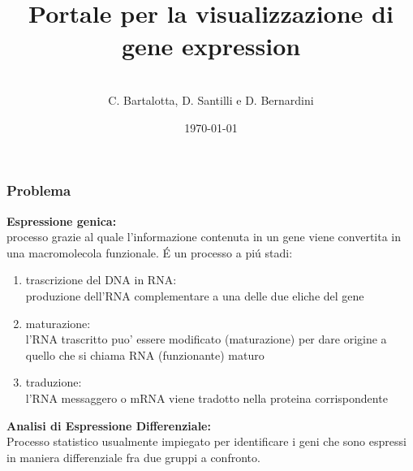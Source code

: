 \documentclass[hyperref={pdfpagelabels=false}]{beamer}
\title{\\Portale per la visualizzazione di gene expression\\}
\author{\\ C. Bartalotta, D. Santilli e D. Bernardini}
\date{\today}
\begin{document}
\begin{frame}
\titlepage
\end{frame} 

\begin{frame}\frametitle{Problema}
\textbf{Espressione genica:}\\
processo grazie al quale l'informazione contenuta in un gene viene convertita in una macromolecola funzionale.
\'E un processo a pi\'u stadi:\pause 
\begin{enumerate}
\item trascrizione del DNA in RNA:\\
produzione dell'RNA complementare a una delle due eliche del gene  \pause 
\item maturazione:\\
l'RNA trascritto puo' essere modificato (maturazione) per dare origine a quello che si chiama RNA (funzionante) maturo \pause 
\item traduzione:\\
l'RNA messaggero o mRNA viene tradotto nella proteina corrispondente
\end{enumerate}
\textbf{Analisi di Espressione Differenziale:}\\
Processo statistico usualmente impiegato per identificare i geni che sono espressi in maniera differenziale fra due gruppi a confronto.\\
\end{frame}
\end{document}
